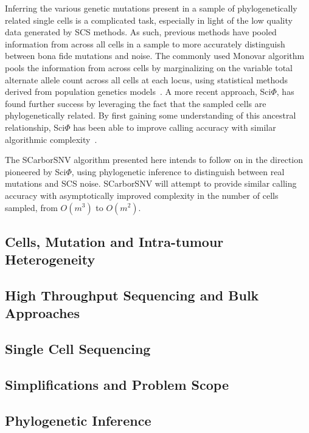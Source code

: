 \documentclass[../main.tex]{subfiles}
\begin{document}
Inferring the various genetic mutations present in a sample of phylogenetically related single cells is a complicated task, especially in light of the low quality data generated by SCS methods.
As such, previous methods have pooled information from across all cells in a sample to more accurately distinguish between bona fide mutations and noise.
The commonly used Monovar algorithm pools the information from across cells by marginalizing on the variable total alternate allele count across all cells at each locus, using statistical methods derived from population genetics models~\cite{monovar}.
A more recent approach, Sci$\Phi$, has found further success by leveraging the fact that the sampled cells are phylogenetically related.
By first gaining some understanding of this ancestral relationship, Sci$\Phi$ has been able to improve calling accuracy with similar algorithmic complexity~\cite{sciphi}.

The SCarborSNV algorithm presented here intends to follow on in the direction pioneered by Sci$\Phi$, using phylogenetic inference to distinguish between real mutations and SCS noise.
SCarborSNV will attempt to provide similar calling accuracy with asymptotically improved complexity in the number of cells sampled, from $O(m^3)$ to $O(m^2)$.

\subsection{Cells, Mutation and Intra-tumour Heterogeneity}


\subsection{High Throughput Sequencing and Bulk Approaches}


\subsection{Single Cell Sequencing}


\subsection{Simplifications and Problem Scope}


\subsection{Phylogenetic Inference}

 
\end{document}
